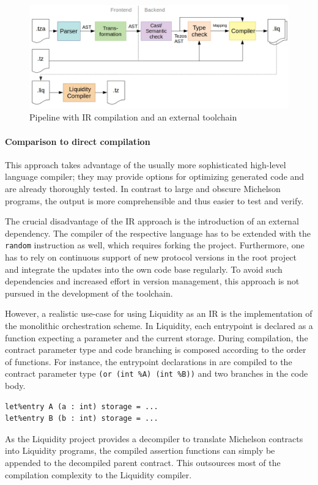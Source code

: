 \begin{figure}[h]
\centering
\includegraphics[width=\linewidth]{figures/5-offline_tezos/pipeline_liq}
\caption{Pipeline with IR compilation and an external toolchain}
\label{fig:pipeline_liq}
\end{figure}

\paragraph{Comparison to direct compilation}
This approach takes advantage of the usually more sophisticated high-level language compiler; they may provide options for optimizing generated code and are already thoroughly tested. In contrast to large and obscure Michelson programs, the output is more comprehensible and thus easier to test and verify.

The crucial disadvantage of the IR approach is the introduction of an external dependency. The compiler of the respective language has to be extended with the \texttt{random} instruction as well, which requires forking the project. Furthermore, one has to rely on continuous support of new protocol versions in the root project and integrate the updates into the own code base regularly. To avoid such dependencies and increased effort in version management, this approach is not pursued in the development of the toolchain.

However, a realistic use-case for using Liquidity as an IR is the implementation of the monolithic orchestration scheme. In Liquidity, each entrypoint is declared as a function expecting a parameter and the current storage. During compilation, the contract parameter type and code branching is composed according to the order of functions. For instance, the entrypoint declarations in  are compiled to the contract parameter type \texttt{(or (int \%A) (int \%B))} and two branches in the code body.  
\begin{lstlisting}[numbers=none, label=lst:liq_eps, caption=Entrypoint declarations in Liquidity]
let%entry A (a : int) storage = ...
let%entry B (b : int) storage = ...
\end{lstlisting}
As the Liquidity project provides a decompiler to translate Michelson contracts into Liquidity programs, the compiled assertion functions can simply be appended to the decompiled parent contract. This outsources most of the compilation complexity to the Liquidity compiler.

